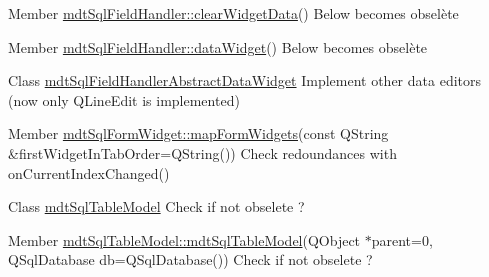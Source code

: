 \label{todo__todo000083}
\hypertarget{todo__todo000083}{}
 
\begin{DoxyDescription}
\item[Member \hyperlink{classmdt_sql_field_handler_ad482be9d476c3310373078a6cd949714}{mdtSqlFieldHandler::clearWidgetData}() ]Below becomes obselète 
\end{DoxyDescription}

\label{todo__todo000082}
\hypertarget{todo__todo000082}{}
 
\begin{DoxyDescription}
\item[Member \hyperlink{classmdt_sql_field_handler_a91ab8160d5015b6030e7169ab7108d33}{mdtSqlFieldHandler::dataWidget}() ]Below becomes obselète 
\end{DoxyDescription}

\label{todo__todo000081}
\hypertarget{todo__todo000081}{}
 
\begin{DoxyDescription}
\item[Class \hyperlink{classmdt_sql_field_handler_abstract_data_widget}{mdtSqlFieldHandlerAbstractDataWidget} ]Implement other data editors (now only QLineEdit is implemented) 
\end{DoxyDescription}

\label{todo__todo000084}
\hypertarget{todo__todo000084}{}
 
\begin{DoxyDescription}
\item[Member \hyperlink{classmdt_sql_form_widget_ace4f7fad749a4efe1233b61d071b3926}{mdtSqlFormWidget::mapFormWidgets}(const QString \&firstWidgetInTabOrder=QString()) ]Check redoundances with onCurrentIndexChanged() 
\end{DoxyDescription}

\label{todo__todo000087}
\hypertarget{todo__todo000087}{}
 
\begin{DoxyDescription}
\item[Class \hyperlink{classmdt_sql_table_model}{mdtSqlTableModel} ]Check if not obselete ? 
\end{DoxyDescription}

\label{todo__todo000086}
\hypertarget{todo__todo000086}{}
 
\begin{DoxyDescription}
\item[Member \hyperlink{classmdt_sql_table_model_ad423c1b0c74ecbbb575637b028c2574b}{mdtSqlTableModel::mdtSqlTableModel}(QObject $\ast$parent=0, QSqlDatabase db=QSqlDatabase()) ]Check if not obselete ? 
\end{DoxyDescription}


